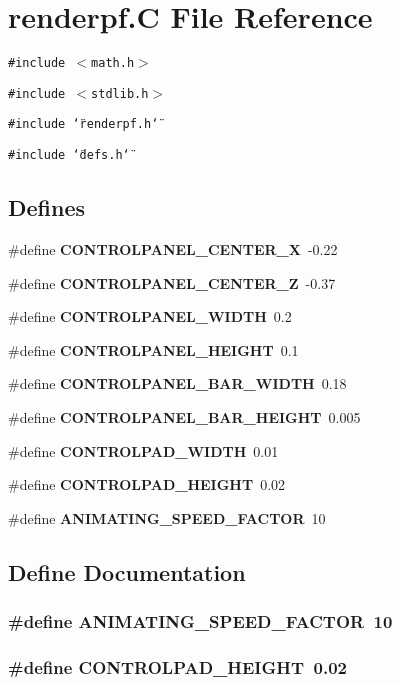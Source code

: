 \section{renderpf.C File Reference}
\label{renderpf_8C}
{\tt \#include $<$math.h$>$}\par
{\tt \#include $<$stdlib.h$>$}\par
{\tt \#include \char`\"{}renderpf.h\char`\"{}}\par
{\tt \#include \char`\"{}defs.h\char`\"{}}\par
\subsection*{Defines}
\begin{CompactItemize}
\item 
\#define {\bf CONTROLPANEL\_\-CENTER\_\-X}\ -0.22
\item 
\#define {\bf CONTROLPANEL\_\-CENTER\_\-Z}\ -0.37
\item 
\#define {\bf CONTROLPANEL\_\-WIDTH}\ 0.2
\item 
\#define {\bf CONTROLPANEL\_\-HEIGHT}\ 0.1
\item 
\#define {\bf CONTROLPANEL\_\-BAR\_\-WIDTH}\ 0.18
\item 
\#define {\bf CONTROLPANEL\_\-BAR\_\-HEIGHT}\ 0.005
\item 
\#define {\bf CONTROLPAD\_\-WIDTH}\ 0.01
\item 
\#define {\bf CONTROLPAD\_\-HEIGHT}\ 0.02
\item 
\#define {\bf ANIMATING\_\-SPEED\_\-FACTOR}\ 10
\end{CompactItemize}


\subsection{Define Documentation}
\subsubsection{\setlength{\rightskip}{0pt plus 5cm}\#define ANIMATING\_\-SPEED\_\-FACTOR\ 10}\label{renderpf_8C_a8}


\subsubsection{\setlength{\rightskip}{0pt plus 5cm}\#define CONTROLPAD\_\-HEIGHT\ 0.02}\label{renderpf_8C_a7}


